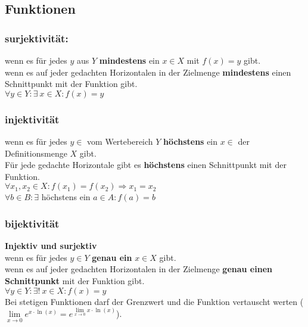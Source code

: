 
\subsection{Funktionen}
\subsubsection{surjektivität:}\label{subs:surjektivitaet}
wenn es für jedes $y$ aus $Y$ \textbf{mindestens} ein $x \in X$ mit $f(x) = y$ gibt.\\
wenn es auf jeder gedachten Horizontalen in der Zielmenge \textbf{mindestens} einen Schnittpunkt mit der Funktion gibt.\\
$\forall y \in Y : \exists \  x \in X:f(x)=y$

\subsubsection{injektivität}\label{subs:injektivitaet}
wenn es für jedes $y \in $ vom Wertebereich $Y$ \textbf{höchstens} ein $x \in$ der Definitionsmenge $X$ gibt.\\
Für jede gedachte Horizontale gibt es \textbf{höchstens} einen Schnittpunkt mit der Funktion.\\
$\forall x_1,x_2 \in X:f(x_1)=f(x_2) \Rightarrow x_1=x_2$\\
$\forall b \in B: \exists$ höchstens ein $a \in A :f(a)=b$\\

\subsubsection{bijektivität}\label{subs:bijektivitaet}  
\textbf{Injektiv und surjektiv}\\
wenn es für jedes $y\in Y$  \textbf{genau ein} $x \in X$ gibt.\\
wenn es auf jeder gedachten Horizontalen in der Zielmenge \textbf{genau einen Schnittpunkt} mit der Funktion gibt.\\
$\forall y \in Y : \exists ! \  x \in X:f(x)=y$\\

Bei stetigen Funktionen darf der Grenzwert und die Funktion vertauscht werten ($\lim\limits_{x\to 0 }e^{x\cdot \ln (x)}=e^{\lim\limits_{x\to 0 }x\cdot \ln(x)}$).